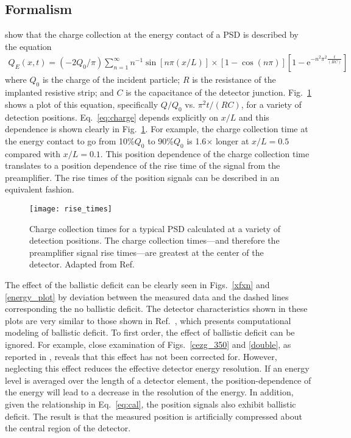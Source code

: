 \subsection{Formalism}
\citet{Kalbitzer_1967} show that the charge collection at the energy contact of a PSD is described by the equation 
\begin{equation}
\begin{split}
Q_E(x,t)=(-2Q_0/\pi)\sum_{n=1}^\infty n^{-1}\sin[n\pi (x/L)]\times \left[1-\cos(n\pi)\right]\left[1-\textrm{e}^{-n^2\pi^2\frac{t}{(RC)}}\right]
\end{split}
\label{eq:charge}
\end{equation}
where $Q_0$ is the charge of the incident particle; $R$ is the resistance of the implanted resistive strip; and $C$ is the capacitance of the detector junction. Fig.~\ref{rise_times} shows a plot of this equation, specifically $Q/Q_0$ vs. $\pi^2t/(RC)$, for a variety of detection positions.  Eq.~\ref{eq:charge} depends explicitly on $x/L$ and this dependence is shown clearly in Fig.~\ref{rise_times}.  For example, the charge collection time at the energy contact to go from 10\%$Q_0$ to 90\%$Q_0$ is 1.6$\times$ longer at $x/L=0.5$ compared with $x/L=0.1$.  This position dependence of the charge collection time translates to a position dependence of the rise time of the signal from the preamplifier.  The rise times of the position signals can be described in an equivalent fashion.

\begin{figure}%
\centering
\texttt{[image: rise\_times]}%
\caption[Charge collection times for a typical PSD calculated at a variety of detection positions]{Charge collection times for a typical PSD calculated at a variety of detection positions.  The charge collection times---and therefore the preamplifier signal rise times---are greatest at the center of the detector.  Adapted from Ref.~\cite[Fig.~4]{Kalbitzer_1967}}%
\label{rise_times}%
\end{figure}
The effect of the ballistic deficit can be clearly seen in Figs.~\ref{xfxn} and \ref{energy_plot} by deviation between the measured data and the dashed lines corresponding the no ballistic deficit.  The detector characteristics shown in these plots are very similar to those shown in Ref.~\cite[Fig.~2]{Doehring_1968}, which presents computational modeling of ballistic deficit.  To first order, the effect of ballistic deficit can be ignored.  For example, close examination of Figs.~\ref{cezg_350} and \ref{double}, as reported in \citet{Lighthall_2010}, reveals that this effect has not been corrected for.  However, neglecting this effect reduces the effective detector energy resolution.  If an energy level is averaged over the length of a detector element, the position-dependence of the energy will lead to a decrease in the resolution of the energy.  In addition, given the relationship in Eq.~\ref{eq:cal}, the position signals also exhibit ballistic deficit.  The result is that the measured position is artificially compressed about the central region of the detector. 

